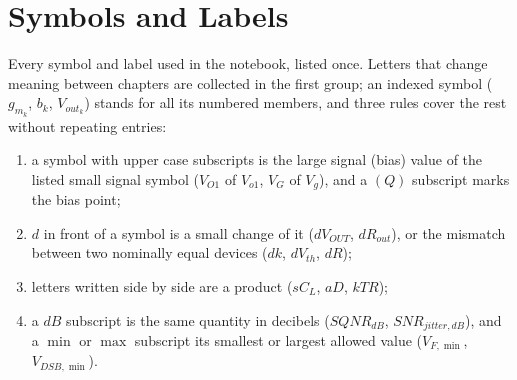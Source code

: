 \section{Symbols and Labels}\label{sec:symbols}
Every symbol and label used in the notebook, listed once. Letters that
change meaning between chapters are collected in the first group; an
indexed symbol (\(g_{m_k}\), \(b_k\), \(V_{out_k}\)) stands for all its numbered
members, and three rules cover the rest without repeating entries:
\begin{enumerate}
  \item a symbol with upper case subscripts is the large signal (bias) value of
    the listed small signal symbol (\(V_{O1}\) of \(V_{o1}\), \(V_G\) of \(V_g\)), and a
    \((Q)\) subscript marks the bias point;
  \item \(d\) in front of a symbol is a small change of it (\(dV_{OUT}\), \(dR_{out}\)), or the
    mismatch between two nominally equal devices (\(dk\), \(dV_{th}\), \(dR\));
  \item letters written side by side are a product (\(sC_L\), \(aD\), \(kTR\));
  \item a \(dB\) subscript is the same quantity in decibels (\(SQNR_{dB}\), \(SNR_{jitter,dB}\)), and a \(\min\) or \(\max\)
    subscript its smallest or largest allowed value (\(V_{F,\min}\), \(V_{DSB,\min}\)).
\end{enumerate}
